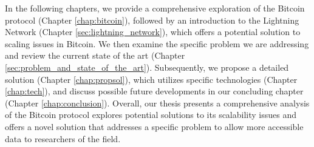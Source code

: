 In the following chapters, we provide a comprehensive exploration of the Bitcoin protocol
(Chapter \ref{chap:bitcoin}), followed by an introduction to the Lightning Network
(Chapter \ref{sec:lightning_network}), which offers a potential solution to scaling issues
in Bitcoin. We then examine the specific problem we are addressing and review the current
state of the art (Chapter \ref{sec:problem_and_state_of_the_art}). Subsequently, we propose
a detailed solution (Chapter \ref{chap:propsol}), which utilizes specific technologies
(Chapter \ref{chap:tech}), and discuss possible future developments in our concluding chapter
(Chapter \ref{chap:conclusion}). Overall, our thesis presents a comprehensive analysis of the
Bitcoin protocol explores potential solutions to its scalability issues and offers a novel
solution that addresses a specific problem to allow more accessible data to researchers of the
field.
